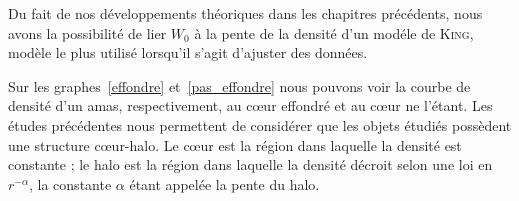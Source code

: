 	Du fait de nos développements théoriques dans les chapitres précédents, nous avons la possibilité de lier
	$W_0$ à la pente de la densité d'un modéle de \textsc{King},  modèle le plus utilisé lorsqu'il s'agit d'ajuster des données.

	Sur les graphes~\ref{effondre} et~\ref{pas_effondre} nous pouvons voir la courbe de densité
	d'un amas, respectivement, au cœur effondré et au cœur ne l'étant.
	Les études précédentes nous permettent de considérer que les objets étudiés possèdent une structure cœur-halo. Le cœur est la région dans laquelle la densité est constante ; le halo est la région dans laquelle la densité
	décroit selon une loi en $r^{-\alpha}$, la constante $\alpha$ étant appelée la pente du halo.

